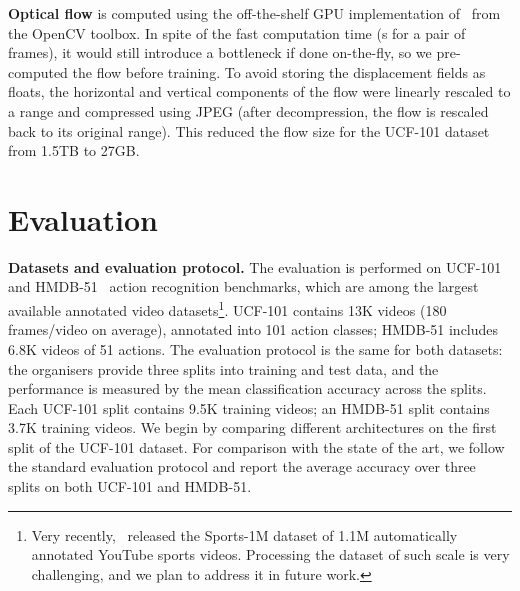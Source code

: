 \documentclass{article} \usepackage{nips14submit_e,times}
\begin{document}
\noindent\textbf{Optical flow} is computed using the off-the-shelf GPU implementation of~\cite{Brox04} from the OpenCV toolbox.
In spite of the fast computation time (s for a pair of frames), it would still introduce a bottleneck if done on-the-fly, 
so we pre-computed the flow before training. To avoid storing the displacement fields as floats, the horizontal and vertical components of the flow were 
linearly rescaled to a  range and compressed using JPEG (after decompression, the flow is rescaled back to its original range).
This reduced the flow size for the UCF-101 dataset from 1.5TB to 27GB.

\section{Evaluation}
\label{sec:eval}
\noindent\textbf{Datasets and evaluation protocol.}
The evaluation is performed on UCF-101~\cite{Soomro12} and \mbox{HMDB-51}~\cite{Kuehne11} action recognition benchmarks, which are among the largest available annotated video
datasets\footnote{Very recently,~\cite{Karpathy14} released the Sports-1M dataset of 1.1M automatically annotated YouTube sports videos. 
Processing the dataset of such scale is very challenging, and we plan to address it in future work.}. 
UCF-101 contains 13K videos (180 frames/video on average), annotated into 101 action classes; HMDB-51 includes 6.8K videos of 51 actions. 
The evaluation protocol is the same for both datasets: the organisers
provide three splits into training and test data, and the performance is measured by the mean classification accuracy across the splits. Each UCF-101 split contains 9.5K training
videos; an HMDB-51 split contains 3.7K training videos.
We begin by comparing different architectures on the first split of the UCF-101 dataset.
For comparison with the state of the art, we follow the standard evaluation protocol and report the average accuracy over three splits on both UCF-101 and HMDB-51. 
\end{document}
